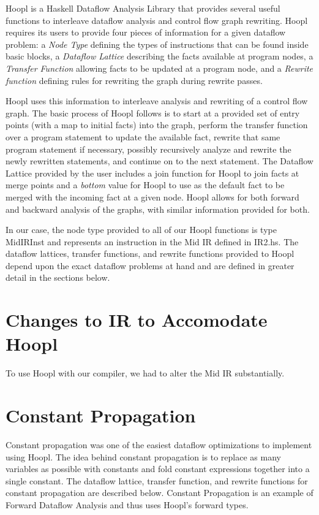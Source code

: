 \documentclass[11pt]{article}
\begin{document}
Hoopl is a Haskell Dataflow Analysis Library that provides several useful functions to interleave dataflow analysis and control flow graph rewriting. Hoopl requires its users to provide four pieces of information for a given dataflow problem: a \emph{Node Type} defining the types of instructions that can be found inside basic blocks, a \emph{Dataflow Lattice} describing the facts available at program nodes, a \emph{Transfer Function} allowing facts to be updated at a program node, and a \emph{Rewrite function} defining rules for rewriting the graph during rewrite passes. 

Hoopl uses this information to interleave analysis and rewriting of a control flow graph. The basic process of Hoopl follows is to start at a provided set of entry points (with a map to initial facts) into the graph, perform the transfer function over a program statement to update the available fact, rewrite that same program statement if necessary, possibly recursively analyze and rewrite the newly rewritten statements, and continue on to the next statement. The Dataflow Lattice provided by the user includes a join function for Hoopl to join facts at merge points and a \emph{bottom} value for Hoopl to use as the default fact to be merged with the incoming fact at a given node. Hoopl allows for both forward and backward analysis of the graphs, with similar information provided for both. 

In our case, the node type provided to all of our Hoopl functions is type MidIRInst and represents an instruction in the Mid IR defined in IR2.hs. The dataflow lattices, transfer functions, and rewrite functions provided to Hoopl depend upon the exact dataflow problems at hand and are defined in greater detail in the sections below. 



\section {Changes to IR to Accomodate Hoopl}
\label{sec:changes} 

To use Hoopl with our compiler, we had to alter the Mid IR substantially. 

\section {Constant Propagation} 
\label{sec:constprop}

Constant propagation was one of the easiest dataflow optimizations to implement using Hoopl. The idea behind constant propagation is to replace as many variables as possible with constants and fold constant expressions together into a single constant. The dataflow lattice, transfer function, and rewrite functions for constant propagation are described below. Constant Propagation is an example of Forward Dataflow Analysis and thus uses Hoopl's forward types. 
\end{document}
